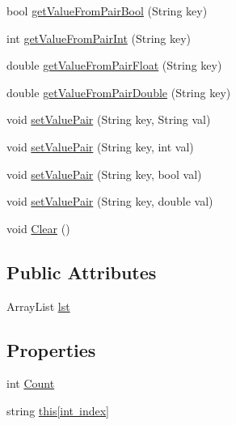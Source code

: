 \begin{DoxyCompactItemize}
\item 
bool \mbox{\hyperlink{class_r_c___framework_1_1_string_list_aaa4de6f577160c504d007cf40c26b0fe}{get\+Value\+From\+Pair\+Bool}} (String key)
\item 
int \mbox{\hyperlink{class_r_c___framework_1_1_string_list_aafae89c64df4e9ce304f9630752ecdb5}{get\+Value\+From\+Pair\+Int}} (String key)
\item 
double \mbox{\hyperlink{class_r_c___framework_1_1_string_list_a443fdfa5da0803a0829fabc67f07ceeb}{get\+Value\+From\+Pair\+Float}} (String key)
\item 
double \mbox{\hyperlink{class_r_c___framework_1_1_string_list_a1cc22de6f1426e3c252ddafe72f0ad13}{get\+Value\+From\+Pair\+Double}} (String key)
\item 
void \mbox{\hyperlink{class_r_c___framework_1_1_string_list_a4d9f43fcffdb7ba930437969c424f9cc}{set\+Value\+Pair}} (String key, String val)
\item 
void \mbox{\hyperlink{class_r_c___framework_1_1_string_list_abde084ee8119ce9ded9ae856973cc436}{set\+Value\+Pair}} (String key, int val)
\item 
void \mbox{\hyperlink{class_r_c___framework_1_1_string_list_aa5acfd2646c1157bcbdb742c85fd79ba}{set\+Value\+Pair}} (String key, bool val)
\item 
void \mbox{\hyperlink{class_r_c___framework_1_1_string_list_a5bac2116e2b9184c093a67757a9d2b9f}{set\+Value\+Pair}} (String key, double val)
\item 
void \mbox{\hyperlink{class_r_c___framework_1_1_string_list_a2a6878c2d02ff919377700dd3b6d10e3}{Clear}} ()
\end{DoxyCompactItemize}
\subsection*{Public Attributes}
\begin{DoxyCompactItemize}
\item 
Array\+List \mbox{\hyperlink{class_r_c___framework_1_1_string_list_a04546b4fdcc200531eb9fc8344f46fcd}{lst}}
\end{DoxyCompactItemize}
\subsection*{Properties}
\begin{DoxyCompactItemize}
\item 
int \mbox{\hyperlink{class_r_c___framework_1_1_string_list_aa27777e3068b19f10bc2e4d326e5c0bd}{Count}}
\item 
string \mbox{\hyperlink{class_r_c___framework_1_1_string_list_ad048db5241753c4e743f018fb5ae7d78}{this\mbox{[}int index\mbox{]}}}
\end{DoxyCompactItemize}


